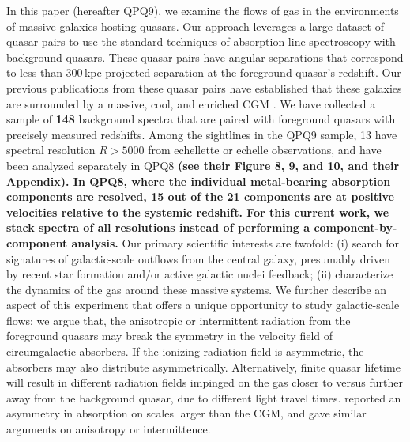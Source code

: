 \documentclass[iop]{emulateapj}
\begin{document}
In this paper (hereafter QPQ9), we examine the flows of gas in the environments of massive 
galaxies hosting quasars. Our approach leverages a large dataset of quasar pairs 
\citep[][hereafter QPQ1]{QPQ1} to use the standard techniques of absorption-line spectroscopy 
with background quasars. These quasar pairs 
have angular separations that correspond to less than 300\,kpc projected separation at the 
foreground quasar's redshift. Our previous publications from these quasar pairs have established 
that these galaxies are surrounded by a massive, cool, and enriched CGM 
\citep[QPQ5, QPQ6, QPQ7:][]{QPQ5,QPQ6,QPQ7}. We have collected a sample of {\bf 148} background
spectra that are paired with foreground quasars with precisely measured redshifts. Among the
sightlines in the QPQ9 sample, 13 have spectral resolution $R>5000$ from echellette or echelle
observations, and have been analyzed separately in QPQ8 {\bf (see their Figure 8, 9, and 10, and their
Appendix). In QPQ8, where the individual metal-bearing absorption components are resolved, 15 out
of the 21 components are at positive velocities relative to the systemic redshift. For this
current work, we stack spectra of all resolutions instead of performing a component-by-component
analysis.} Our primary scientific interests are twofold: (i) search for signatures of galactic-scale
outflows from the central galaxy, presumably driven by recent star formation and/or active galactic
nuclei feedback; (ii) characterize the dynamics of the gas around these massive systems. We further
describe an aspect of this experiment that offers a unique opportunity to study galactic-scale
flows: we argue that, the anisotropic or intermittent radiation from the foreground quasars may
break the symmetry in the velocity field of circumgalactic absorbers. If the ionizing radiation
field is asymmetric, the absorbers may also distribute asymmetrically. Alternatively, finite quasar
lifetime will result in different radiation fields impinged on the gas closer to versus further
away from the background quasar, due to different light travel times. \cite{KirkmanTytler08}
reported an asymmetry in  absorption on scales larger than the CGM, and gave similar
arguments on anisotropy or intermittence.
\end{document}
